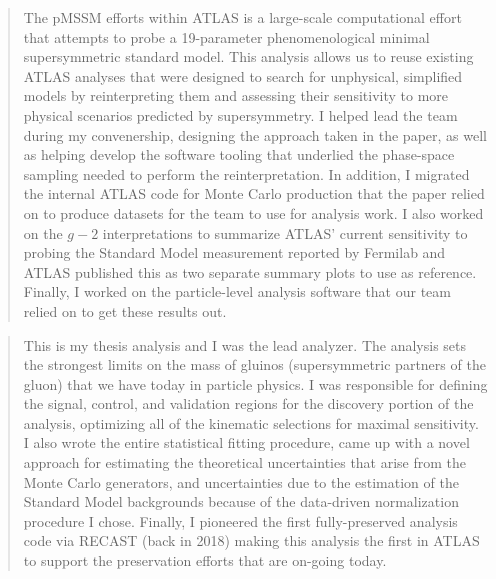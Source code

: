 \begin{quotation}
	The pMSSM efforts within ATLAS is a large-scale computational effort that attempts to probe a 19-parameter phenomenological minimal supersymmetric standard model.
	This analysis allows us to reuse existing ATLAS analyses that were designed to search for unphysical, simplified models by reinterpreting them and assessing their sensitivity to more physical scenarios predicted by supersymmetry.
	I helped lead the team during my convenership, designing the approach taken in the paper, as well as helping develop the software tooling that underlied the phase-space sampling needed to perform the reinterpretation.
	In addition, I migrated the internal ATLAS code for Monte Carlo production that the paper relied on to produce datasets for the team to use for analysis work.
	I also worked on the $g-2$ interpretations to summarize ATLAS' current sensitivity to probing the Standard Model measurement reported by Fermilab and ATLAS published this as two separate summary plots to use as reference.
	Finally, I worked on the particle-level analysis software that our team relied on to get these results out.
\end{quotation}

\begin{quotation}
	This is my thesis analysis and I was the lead analyzer.
	The analysis sets the strongest limits on the mass of gluinos (supersymmetric partners of the gluon) that we have today in particle physics.
	I was responsible for defining the signal, control, and validation regions for the discovery portion of the analysis, optimizing all of the kinematic selections for maximal sensitivity.
	I also wrote the entire statistical fitting procedure, came up with a novel approach for estimating the theoretical uncertainties that arise from the Monte Carlo generators, and uncertainties due to the estimation of the Standard Model backgrounds because of the data-driven normalization procedure I chose.
	Finally, I pioneered the first fully-preserved analysis code via RECAST (back in 2018) making this analysis the first in ATLAS to support the preservation efforts that are on-going today.
\end{quotation}

